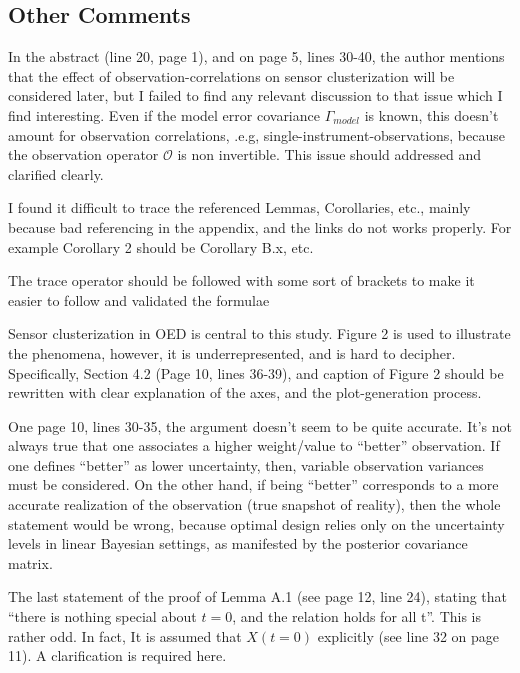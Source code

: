 \documentclass{amsart}
\begin{document}
\subsection{Other Comments}

In the abstract (line 20, page 1), and on page 5, lines 30-40, the
author mentions that the effect of observation-correlations on sensor
clusterization will be considered later, but I failed to find any
relevant discussion to that issue which I find interesting. Even if
the model error covariance $\Gamma_{model}$ is known, this doesn't
amount for observation correlations, .e.g,
single-instrument-observations, because the observation operator
$\mathcal{O}$ is non invertible. This issue should addressed and
clarified clearly.

I found it difficult to trace the referenced Lemmas, Corollaries,
etc., mainly because bad referencing in the appendix, and the links do
not works properly.  For example Corollary 2 should be Corollary B.x,
etc. 

The trace operator should be followed with some sort of brackets to
make it easier to follow and validated the formulae

Sensor clusterization in OED is central to this study. Figure 2 is
used to illustrate the phenomena, however, it is underrepresented, and
is hard to decipher. Specifically, Section 4.2 (Page 10, lines 36-39),
and caption of Figure 2 should be rewritten with clear explanation of
the axes, and the plot-generation process.

One page 10, lines 30-35, the argument doesn't seem to be quite
accurate. It's not always true that one associates a higher
weight/value to ``better'' observation. If one defines ``better'' as
lower uncertainty, then, variable observation variances must be
considered. On the other hand, if being ``better'' corresponds to a
more accurate realization of the observation (true snapshot of
reality), then the whole statement would be wrong, because optimal
design relies only on the uncertainty levels in linear Bayesian
settings, as manifested by the posterior covariance matrix.

The last statement of the proof of Lemma A.1 (see page 12, line 24),
stating that ``there is nothing special about $t=0$, and the relation
holds for all t''. This is rather odd. In fact, It is assumed that
$X(t=0)$ explicitly (see line 32 on page 11). A clarification is
required here.
\end{document}
